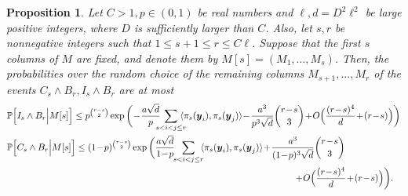 \documentclass[11pt]{amsart}
\newtheorem{proposition}[theorem]{\bf Proposition}
\theoremstyle{definition}
\def\Pb{\mathbb{P}}
\def\by{\boldsymbol{y}}
\begin{document}
\begin{proposition}\label{prop:induction_1}
Let $C>1, p\in (0, 1)$ be real numbers and $\ell, d=D^2\ell^2$ be large positive integers, where $D$ is sufficiently larger than $C$. Also, let $s, r$ be nonnegative integers such that $1\leq s+1\leq r\leq C\ell$. Suppose that the first $s$ columns of $M$ are fixed, and denote them by $M[s]=(M_1, \dots, M_{s})$. Then, the probabilities over the random choice of the remaining columns $M_{s+1}, \dots, M_r$ of the events $C_{s}\wedge B_r, I_{s}\wedge B_r$ are at most
{\smaller[0.3]
\begin{align}
    &\Pb\Big[I_s\wedge B_r\Big| M[s]\Big]\leq p^{\binom{r-s}{2}}\exp\bigg(\!-\!\frac{a\sqrt{d}}{p}\!\!\!\!\sum_{s<i< j\leq r}\!\!\!\!\langle \pi_s(\by_i), \pi_s(\by_j)\rangle \!-\!\frac{a^3}{p^3\sqrt{d}}\binom{r\!-\!s}{3}\!+\!O\Big(\frac{(r\!-\!s)^4}{d}\!+\!(r\!-\!s)\Big)\bigg)\label{eq:induction_bound_red}\\
    &\Pb\Big[C_s\wedge B_r\Big| M[s]\Big]\leq (1\!-\!p)^{\binom{r-s}{2}}\exp\bigg(\frac{a\sqrt{d}}{1\!-\!p}\!\!\sum_{s<i< j\leq r}\!\!\langle \pi_s(\by_i), \pi_s(\by_j)\rangle\!+\!\frac{a^3}{(1\!-\!p)^3\sqrt{d}}\binom{r\!-\!s}{3}  \label{eq:induction_bound_blue} \\
    &\hspace{11.0cm}\!+\!O\Big(\frac{(r\!-\!s)^4}{d}\!+\!(r\!-\!s)\Big)\bigg) \notag.
\end{align}
}
\end{proposition}
\end{document}
